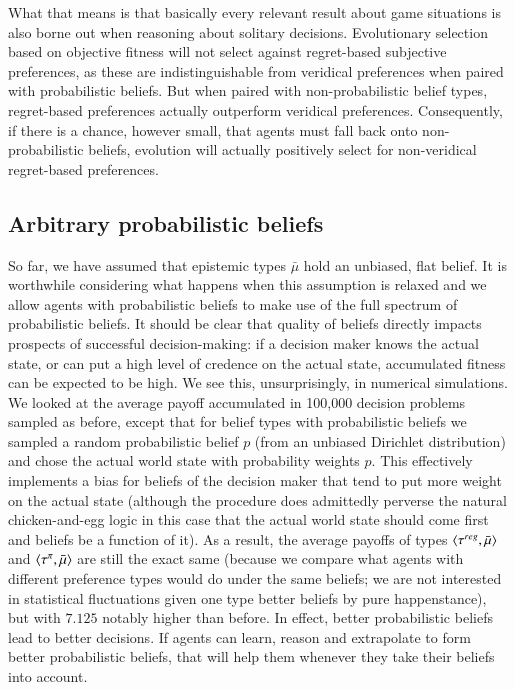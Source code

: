 \documentclass[fleqn,reqno,11pt]{article}
\begin{document}
What that means is that basically every relevant result about game situations is also borne out
when reasoning about solitary decisions. Evolutionary selection based on objective fitness will
not select against regret-based subjective preferences, as these are indistinguishable from
veridical preferences when paired with probabilistic beliefs. But when paired with
non-probabilistic belief types, regret-based preferences actually outperform veridical
preferences. Consequently, if there is a chance, however small, that agents must fall back onto
non-probabilistic beliefs, evolution will actually positively select for non-veridical
regret-based preferences.

\subsection{Arbitrary probabilistic beliefs}
\label{sec:arbitr-prob-beli}

So far, we have assumed that epistemic types $\bar{\mu}$ hold an unbiased, flat belief. It is
worthwhile considering what happens when this assumption is relaxed and we allow agents with
probabilistic beliefs to make use of the full spectrum of probabilistic beliefs. It should be
clear that quality of beliefs directly impacts prospects of successful decision-making: if a
decision maker knows the actual state, or can put a high level of credence on the actual state,
accumulated fitness can be expected to be high. We see this, unsurprisingly, in numerical
simulations. We looked at the average payoff accumulated in 100,000 decision problems sampled
as before, except that for belief types with probabilistic beliefs we sampled a random
probabilistic belief $p$ (from an unbiased Dirichlet distribution) and chose the actual world
state with probability weights $p$. This effectively implements a bias for beliefs of the
decision maker that tend to put more weight on the actual state (although the procedure does
admittedly perverse the natural chicken-and-egg logic in this case that the actual world state
should come first and beliefs be a function of it). As a result, the average payoffs of types
$\left \langle \tau^{reg}, \bar{\mu}\right\rangle$ and $\left \langle \tau^{\pi}, \bar{\mu}\right\rangle$ are still the exact same
(because we compare what agents with different preference types would do under the same
beliefs; we are not interested in statistical fluctuations given one type better beliefs by
pure happenstance), but with $7.125$ notably higher than before. In effect, better
probabilistic beliefs lead to better decisions. If agents can learn, reason and extrapolate to
form better probabilistic beliefs, that will help them whenever they take their beliefs into
account. 
\end{document}
